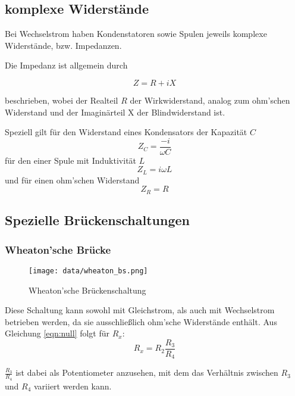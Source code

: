 \subsection{komplexe Widerstände}

Bei Wechselstrom haben Kondenstatoren sowie Spulen jeweils komplexe Widerstände, bzw. Impedanzen.

Die Impedanz ist allgemein durch

\begin{equation}
    Z = R + iX
\end{equation}

beschrieben, wobei der Realteil $R$ der Wirkwiderstand, analog zum ohm'schen Widerstand und  der Imaginärteil
X der Blindwiderstand ist. 

Speziell gilt für den Widerstand eines Kondensators der Kapazität $C$ \begin{equation}
    Z_C = \frac{-i}{\omega C}
\end{equation} für den einer Spule mit Induktivität $L$ \begin{equation}
    Z_L = i\omega L
\end{equation} und für einen ohm'schen Widerstand \begin{equation}
    Z_R = R
\end{equation}

\subsection{Spezielle Brückenschaltungen}

\subsubsection{Wheaton'sche Brücke}
\begin{figure}
\centering
\texttt{[image: data/wheaton\_bs.png]}
\caption{Wheaton'sche Brückenschaltung}
\label{fig:wheaton}
\end{figure}
Diese Schaltung kann sowohl mit Gleichstrom, als auch mit Wechselstrom betrieben werden, da sie ausschließlich
ohm'sche Widerstände enthält. 
Aus Gleichung \ref{eqn:null} folgt für $R_x$:
\begin{equation}
\label{eqn:wheaton}
 R_x = R_2 \frac{R_3}{R_4}
\end{equation}

$\frac{R_3}{R_4}$ ist dabei als Potentiometer anzusehen, mit dem das Verhältnis zwischen $R_3$ und $R_4$ 
variiert werden kann. 

